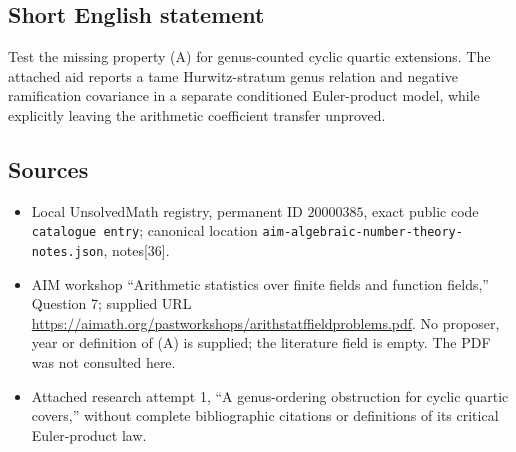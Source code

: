 \documentclass[11pt]{article}
\begin{document}
\subsection{Short English statement}
Test the missing property (A) for genus-counted cyclic quartic extensions. The attached aid reports a tame Hurwitz-stratum genus relation and negative ramification covariance in a separate conditioned Euler-product model, while explicitly leaving the arithmetic coefficient transfer unproved.
\subsection{Sources}
\begin{itemize}
\item Local UnsolvedMath registry, permanent ID \(20000385\), exact public code \texttt{catalogue entry}; canonical location \texttt{aim-algebraic-number-theory-notes.json}, notes[36].
\item AIM workshop ``Arithmetic statistics over finite fields and function fields,'' Question 7; supplied URL \url{https://aimath.org/pastworkshops/arithstatffieldproblems.pdf}. No proposer, year or definition of (A) is supplied; the literature field is empty. The PDF was not consulted here.
\item Attached research attempt 1, ``A genus-ordering obstruction for cyclic quartic covers,'' without complete bibliographic citations or definitions of its critical Euler-product law.
\end{itemize}
\end{document}
